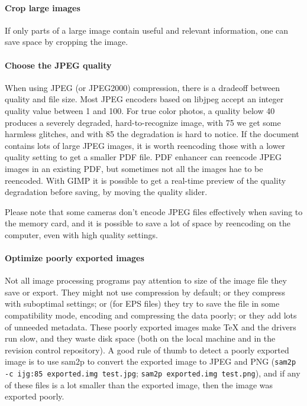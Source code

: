 \documentclass{ltugproc}
\def\cmd{\textsf}
\begin{document}
\paragraph{Crop large images}

If only parts of a large image contain useful and relevant information, one
can save space by cropping the image.

\paragraph{Choose the JPEG quality}

When using JPEG (or JPEG2000) compression, there is a dradeoff between
quality and file size. Most JPEG encoders based on libjpeg accept an integer
quality value between 1 and 100. For true color photos, a quality below 40
produces a severely degraded, hard-to-recognize image, with 75 we get some
harmless glitches, and with 85 the degradation is hard to notice. If the
document contains lots of large JPEG images, it is worth reencoding those
with a lower quality setting to get a smaller PDF file. PDF enhancer can
reencode JPEG images in an existing PDF, but sometimes not all the images
hae to be reencoded. With GIMP it is possible to get a real-time preview of
the quality degradation before saving, by moving the quality slider.

Please note that some cameras don't encode JPEG files effectively when
saving to the memory card, and it is possible to save a lot of space by
reencoding on the computer, even with high quality settings.

\paragraph{Optimize poorly exported images}

Not all image processing programs pay attention to size of the image file
they save or export. They might not use compression by default; or they
compress with suboptimal settings; or (for EPS files) they try to save the
file in some compatibility mode, encoding and compressing the data poorly;
or they add lots of unneeded metadata. These poorly exported images make
\TeX{} and the drivers run slow, and they waste disk space (both on the
local machine and in the revision control repository). A good rule of thumb
to detect a poorly exported image
is to use \cmd{sam2p} to convert the exported image to JPEG and PNG
(\texttt{sam2p -c ijg:85 exported.img test.jpg};
\texttt{sam2p exported.img test.png}), and if any of these files is a lot
smaller than the exported image, then the image was exported poorly.
\end{document}
